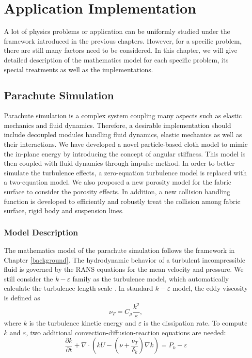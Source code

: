 \chapter{Application Implementation}
A lot of physics problems or application can be uniformly studied under the framework introduced in the previous chapters. However, for a specific problem, there are still many factors need to be considered. In this chapter, we will give detailed description of the mathematics model for each specific problem, its special treatments as well as the implementations.
\section{Parachute Simulation}
Parachute simulation is a complex system coupling many aspects such as 
elastic mechanics and fluid dynamics. Therefore, a desirable implementation should include decoupled modules handling fluid dynamics, elastic mechanics as well as their interactions. We have developed a novel particle-based cloth model to mimic the in-plane energy by introducing the concept of angular stiffness. This model is then coupled with fluid dynamics through impulse method. In order to better simulate the turbulence effects, a zero-equation turbulence model is replaced with a two-equation model. We also proposed a new 
porosity model for the fabric surface to consider the porosity effects. 
In addition, a new collision handling function is developed to efficiently and 
robustly treat the collision among fabric surface, rigid body and suspension lines.

\subsection{Model Description}
The mathematics model of the parachute simulation follows the framework in Chapter \ref{background}. The hydrodynamic behavior of a turbulent incompressible fluid is governed by the RANS equations for the mean velocity and pressure. We still consider the $k-\varepsilon$ family as the turbulence model, which automatically
calculate the turbulence length scale \cite{WilcoxTurbulence2006}.  In standard
$k-\varepsilon$ model, the eddy viscosity is defined as 
\begin{equation} \nu_T =
C_{\mu}\frac{k^2}{\varepsilon}, \label{eq:nuT} 
\end{equation} 
where $k$ is the turbulence kinetic energy and $\varepsilon$ is the dissipation rate. To compute $k$ and $\varepsilon$, two additional convection-diffusion-reaction equations
are needed: 
\begin{equation} 
\frac{\partial k}{\partial
t}+\nabla\cdot(kU-(\nu+\frac{\nu_T}{\delta_k})\nabla k) =P_k - \varepsilon
\label{eq:k} 
\end{equation} 

